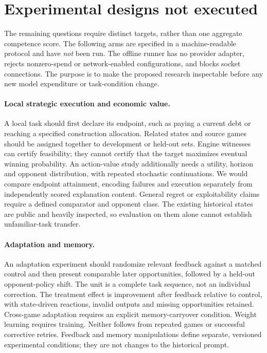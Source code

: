 \section{Experimental designs not executed}

\label{sec:agenda-prospective-evaluation}

The remaining questions require distinct targets, rather than one aggregate competence score. The following arms are specified in a machine-readable protocol and have \emph{not} been run. The offline runner has no provider adapter, rejects nonzero-spend or network-enabled configurations, and blocks socket connections. The purpose is to make the proposed research inspectable before any new model expenditure or task-condition change.

\paragraph{Local strategic execution and economic value.}
A local task should first declare its endpoint, such as paying a current debt or reaching a specified construction allocation. Related states and source games should be assigned together to development or held-out sets. Engine witnesses can certify feasibility; they cannot certify that the target maximizes eventual winning probability. An action-value study additionally needs a utility, horizon and opponent distribution, with repeated stochastic continuations. We would compare endpoint attainment, encoding failures and execution separately from independently scored explanation content. General regret or exploitability claims require a defined comparator and opponent class. The existing historical states are public and heavily inspected, so evaluation on them alone cannot establish unfamiliar-task transfer.

\paragraph{Adaptation and memory.}
An adaptation experiment should randomize relevant feedback against a matched control and then present comparable later opportunities, followed by a held-out opponent-policy shift. The unit is a complete task sequence, not an individual correction. The treatment effect is improvement after feedback relative to control, with state-driven reactions, invalid outputs and missing opportunities retained. Cross-game adaptation requires an explicit memory-carryover condition. Weight learning requires training. Neither follows from repeated games or successful corrective retries. Feedback and memory manipulations define separate, versioned experimental conditions; they are not changes to the historical prompt.

